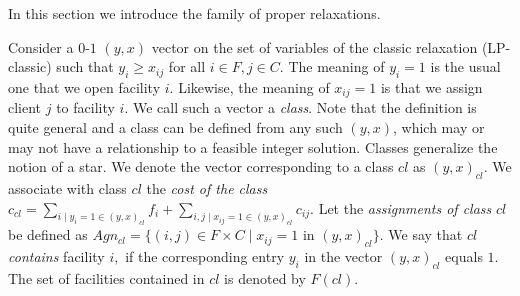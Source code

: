 \documentclass[11pt]{article}\usepackage{amsmath}
\newtheorem{definition}{Definition}[section]
\newcommand{\lbfl}{{\sc Lbfl}}
\begin{document}
In this section  we introduce  the family of  proper relaxations.

Consider a   $0$-$1$ $(y,x)$ vector on the set of
 variables  of the  classic  relaxation (LP-classic)
such that $y_i \geq x_{ij}$ for all $i \in F, j \in C.$  The meaning  of
 $y_i=1$ is the usual one that
 we open facility $i.$  Likewise, the meaning of $x_{ij}=1$ is
 that we assign client $j$ to facility $i$. We call such a vector a 
 \emph{class}. Note that  the definition is quite general  and a class
 can be defined  from any such $(y,x)$, which may or  may not have a
 relationship  to a  feasible  integer solution.  
Classes generalize the notion of a star. 
We  denote the  vector
 corresponding  to a  class $cl$  as $(y,x)_{cl}$.  We  associate with
 class  $cl$   the  {\em cost   of  the  class}   $c_{cl}=\sum_{i \mid
   y_i=1  \in
   (y,x)_{cl}} f_i+  \sum_{i,j \mid  x_{ij}=1 \in  (y,x)_{cl}}
 c_{ij}$. Let the {\em assignments of class} $cl$ be defined as 
 $Agn_{cl}= \{(i,j) \in F\times C \mid  x_{ij}=1$ in $(y,x)_{cl}\}$.
We say that $cl$ {\em contains}  facility $i,$ if the corresponding entry
$y_i$  in the vector $(y,x)_{cl}$ equals $1.$  
The set of facilities contained in $cl$ is denoted by 
 $F(cl).$ 


\iffalse ------------

\begin{definition}  {\bf (Constellation LPs)} \label{def:constell}
Let $\mathcal{C}$ be a set of classes defined for an instance $I(F,C)$
of
\lbfl. Let $x_{cl}$  be a variable associated with class $cl \in
\mathcal{C}.$
The {\em  constellation LP with class set}
  $\mathcal{C}$ is defined as 

\begin{align*} 
\min \sum_{cl \in \mathcal{C}} c_{cl}x_{cl} &&  \tag{LP($\mathcal{C}$)} \\
\sum\nolimits_{{cl} \mid  \exists i:(i,j) \in  Agn_{cl}}
x_{cl}=1 && \forall j \in C   \\
\sum\nolimits_{{cl} \mid  i  \in  F({cl})} x_{cl} \leq 1 &&
\forall i \in F  \\
 x_{cl} \geq 0  && \forall cl \in \mathcal{C} 
\end{align*} 

\end{definition}
In what follows we will refer simply to a constellation LP when
$\mathcal{C}$ is implied from the context.  
------------------ \fi 
\end{document}
